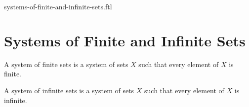 \documentclass{naproche-library}
\begin{document}
\begin{smodule}{systems-of-finite-and-infinite-sets.ftl}

  \section*{Systems of Finite and Infinite Sets}

  \begin{definition}[forthel,id=FOUNDATIONS_14_1387314525765632]
    A system of finite sets is a system of sets $X$ such that every element of $X$ is finite.
  \end{definition}

  \begin{definition}[forthel,id=FOUNDATIONS_14_5698452102154785]
    A system of infinite sets is a system of sets $X$ such that every element of $X$ is infinite.
  \end{definition}
\end{smodule}
\end{document}
